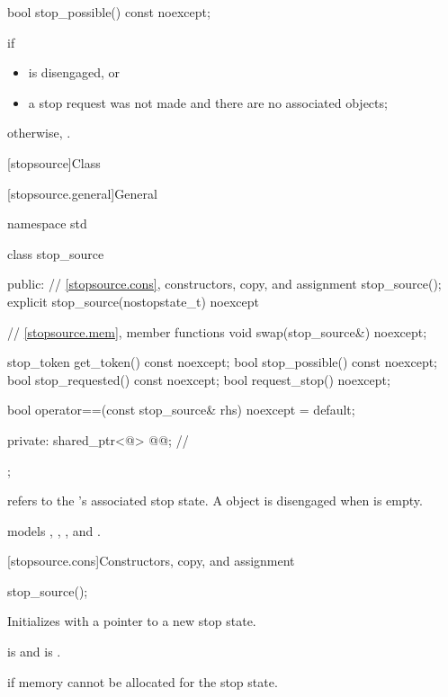 %
\begin{itemdecl}
bool stop_possible() const noexcept;
\end{itemdecl}

\begin{itemdescr}
\pnum
\returns
{} if
\begin{itemize}
\item {} is disengaged, or
\item a stop request was not made
      and there are no associated  objects;
\end{itemize}
otherwise, .
\end{itemdescr}

[stopsource]{Class }%
%

[stopsource.general]{General}

\begin{codeblock}
namespace std {
  class stop_source {
  public:
    // \ref{stopsource.cons}, constructors, copy, and assignment
    stop_source();
    explicit stop_source(nostopstate_t) noexcept {}

    // \ref{stopsource.mem}, member functions
    void swap(stop_source&) noexcept;

    stop_token get_token() const noexcept;
    bool stop_possible() const noexcept;
    bool stop_requested() const noexcept;
    bool request_stop() noexcept;

    bool operator==(const stop_source& rhs) noexcept = default;

  private:
    shared_ptr<@\unspec@> @@;                         // \expos
  };
}
\end{codeblock}

\pnum
{} refers to the 's associated stop state.
A  object is disengaged when  is empty.

\pnum
{} models
,
,
, and
.

[stopsource.cons]{Constructors, copy, and assignment}

%
\begin{itemdecl}
stop_source();
\end{itemdecl}

\begin{itemdescr}
\pnum
\effects
Initializes  with a pointer to a new stop state.

\pnum
\ensures
{} is 
and  is .

\pnum
\throws
{} if memory cannot be allocated for the stop state.
\end{itemdescr}

